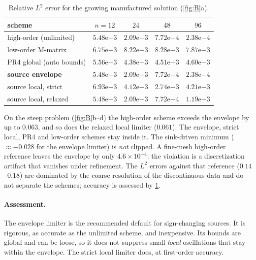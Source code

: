 \documentclass[11pt]{article}
\numberwithin{equation}{section}
\theoremstyle{remark}
\begin{document}
\begin{table}[h]
\centering
\caption{Relative $L^2$ error for the growing manufactured solution (\cref{fig:B}a).}
\begin{tabular}{@{}lcccc@{}}
\toprule
scheme & $n=12$ & $24$ & $48$ & $96$ \\
\midrule
high-order (unlimited) & $5.48\mathrm{e}{-3}$ & $2.09\mathrm{e}{-3}$ & $7.72\mathrm{e}{-4}$ & $2.38\mathrm{e}{-4}$ \\
low-order M-matrix & $6.75\mathrm{e}{-3}$ & $8.22\mathrm{e}{-3}$ & $8.28\mathrm{e}{-3}$ & $7.87\mathrm{e}{-3}$ \\
PR4 global (auto bounds) & $5.56\mathrm{e}{-3}$ & $4.38\mathrm{e}{-3}$ & $4.51\mathrm{e}{-3}$ & $4.60\mathrm{e}{-3}$ \\
\textbf{source envelope} & $5.48\mathrm{e}{-3}$ & $2.09\mathrm{e}{-3}$ & $7.72\mathrm{e}{-4}$ & $2.38\mathrm{e}{-4}$ \\
source local, strict & $6.93\mathrm{e}{-3}$ & $4.12\mathrm{e}{-3}$ & $2.74\mathrm{e}{-3}$ & $4.21\mathrm{e}{-3}$ \\
source local, relaxed & $5.48\mathrm{e}{-3}$ & $2.09\mathrm{e}{-3}$ & $7.72\mathrm{e}{-4}$ & $1.19\mathrm{e}{-3}$ \\
\bottomrule
\end{tabular}
\label{tab:B}
\end{table}

On the steep problem (\cref{fig:B}b--d) the high-order scheme exceeds the
envelope by up to $0.063$, and so does the relaxed local limiter ($0.061$).  The
envelope, strict local, PR4 and low-order schemes stay inside it.  The
sink-driven minimum ($\approx-0.028$ for the envelope limiter) is \emph{not}
clipped.  A fine-mesh high-order reference leaves the envelope by only
$4.6\times10^{-4}$: the violation is a discretization artifact that vanishes
under refinement.  The $L^2$ errors against that reference ($0.14$--$0.18$) are
dominated by the coarse resolution of the discontinuous data and do not
separate the schemes; accuracy is assessed by \cref{tab:B}.

\paragraph{Assessment.}  The envelope limiter is the recommended default for
sign-changing sources.  It is rigorous, as accurate as the unlimited scheme, and
inexpensive.  Its bounds are global and can be loose, so it does not suppress
small \emph{local} oscillations that stay within the envelope.  The strict
local limiter does, at first-order accuracy.
\end{document}
